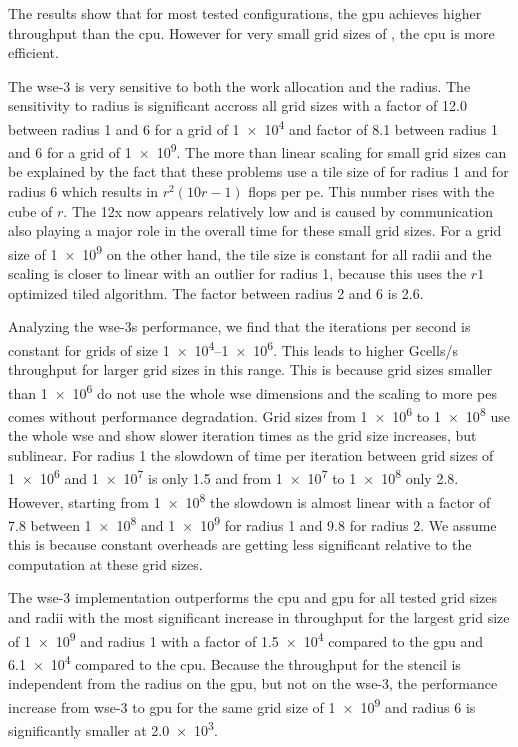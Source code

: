 The results show that for most tested configurations, the \ac{gpu} achieves higher throughput than the \ac{cpu}.
However for very small grid sizes of , the \ac{cpu} is more efficient.

The \ac{wse}-3 is very sensitive to both the work allocation and the radius. The sensitivity to radius is significant accross all grid sizes with a factor of \num{12.0} between radius \num{1} and \num{6} for a grid of \num{1e4} and factor of \num{8.1} between radius \num{1} and \num{6} for a grid of \num{1e9}.
The more than linear scaling for small grid sizes can be explained by the fact that these problems use a tile size of  for radius \num{1} and  for radius \num{6} which results in $r^2(10r-1)$ flops per \ac{pe}. This number rises with the cube of $r$. The 12x now appears relatively low and is caused by communication also playing a major role in the overall time for these small grid sizes. For a grid size of \num{1e9} on the other hand, the tile size is constant for all radii and the scaling is closer to linear with an outlier for radius \num{1}, because this uses the $r1$ optimized tiled algorithm. The factor between radius \num{2} and \num{6} is \num{2.6}.

Analyzing the \ac{wse}-3s performance, we find that the iterations per second is constant for grids of size \numrange{1e4}{1e6}. This leads to higher Gcells/s throughput for larger grid sizes in this range. This is because grid sizes smaller than \num{1e6} do not use the whole \ac{wse} dimensions and the scaling to more \acp{pe} comes without performance degradation. Grid sizes from \num{1e6} to \num{1e8} use the whole \ac{wse} and show slower iteration times as the grid size increases, but sublinear. For radius \num{1} the slowdown of time per iteration between grid sizes of \num{1e6} and \num{1e7} is only \num{1.5} and from \num{1e7} to \num{1e8} only \num{2.8}. However, starting from \num{1e8} the slowdown is almost linear with a factor of \num{7.8} between \num{1e8} and \num{1e9} for radius \num{1} and \num{9.8} for radius \num{2}. We assume this is because constant overheads are getting less significant relative to the computation at these grid sizes.

The \ac{wse}-3 implementation outperforms the \ac{cpu} and \ac{gpu} for all tested grid sizes and radii with the most significant increase in throughput for the largest grid size of \num{1e9} and radius \num{1} with a factor of \num{1.5e4} compared to the \ac{gpu} and \num{6.1e4} compared to the \ac{cpu}. Because the throughput for the stencil is independent from the radius on the \ac{gpu}, but not on the \ac{wse}-3, the performance increase from \ac{wse}-3 to \ac{gpu} for the same grid size of \num{1e9} and radius \num{6} is significantly smaller at \num{2.0e3}.


